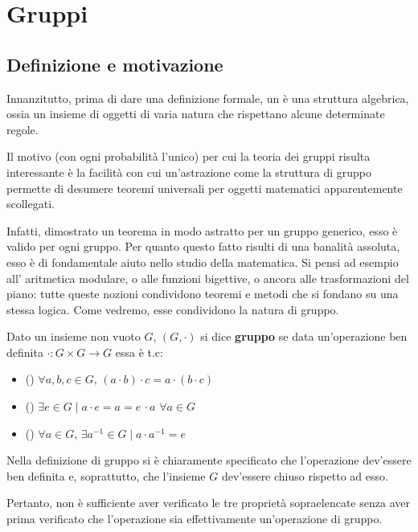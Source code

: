 \section{Gruppi}

\subsection{Definizione e motivazione}

Innanzitutto, prima di dare una definizione formale, un
 è una struttura algebrica, ossia un insieme
di oggetti di varia natura che rispettano alcune determinate
regole.

Il motivo (con ogni probabilità l'unico) per cui la teoria dei
gruppi risulta interessante è la facilità con cui un'astrazione
come la struttura di gruppo permette di desumere teoremi universali
per oggetti matematici apparentemente scollegati.

Infatti, dimostrato un teorema in modo astratto per un gruppo
generico, esso è valido per ogni gruppo. Per quanto questo
fatto risulti di una banalità assoluta, esso è di fondamentale
aiuto nello studio della matematica. Si pensi ad esempio all'
aritmetica modulare, o alle funzioni bigettive, o ancora
alle trasformazioni del piano: tutte queste nozioni condividono
teoremi e metodi che si fondano su una stessa logica. Come vedremo,
esse condividono la natura di gruppo.

\begin{definition}
    Dato un insieme non vuoto $G$, $(G, \cdot)$ si dice \textbf{gruppo} se data
    un'operazione ben definita $\cdot : G \times G \to G$ essa è t.c:

    \begin{itemize}
        \item () $\forall a, b, c \in G, \, (a \cdot b) \cdot c = a \cdot (b \cdot c)$
        \item () $\exists e \in G \mid a \cdot e = a = e \, \cdot a \,\, \forall a \in G$
        \item () $\forall a \in G, \, \exists a^{-1} \in G \mid a \cdot a^{-1} = e$
    \end{itemize}
\end{definition}

\begin{remark}
    Nella definizione di gruppo si è chiaramente specificato che l'operazione dev'essere
    ben definita e, soprattutto, che l'insieme $G$ dev'essere chiuso rispetto ad esso.
    
    Pertanto, non è sufficiente aver verificato le tre proprietà sopraelencate senza
    aver prima verificato che l'operazione sia effettivamente un'operazione di
    gruppo.
\end{remark}

